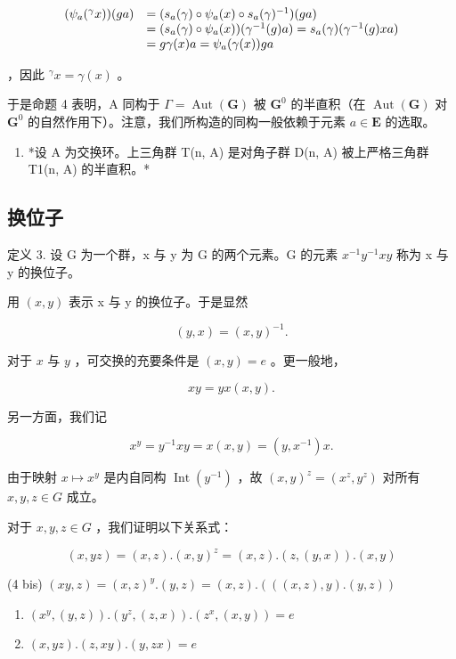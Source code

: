 \[
\begin{array}{r l} (\psi_ {a} (^ {\gamma} x)) (g a) & = (s _ {a} (\gamma) \circ \psi_ {a} (x) \circ s _ {a} (\gamma) ^ {- 1}) (g a) \\ & = (s _ {a} (\gamma) \circ \psi_ {a} (x)) (\gamma^ {- 1} (g) a) = s _ {a} (\gamma) (\gamma^ {- 1} (g) x a) \\ & = g \gamma (x) a = \psi_ {a} (\gamma (x)) g a \end{array}
\]

，因此 \({}^{\gamma}x = \gamma(x)\) 。

于是命题 4 表明，A 同构于 \(\Gamma = \operatorname{Aut}(\mathbf{G})\) 被 \(\mathbf{G}^0\) 的半直积（在 \(\operatorname{Aut}(\mathbf{G})\) 对 \(\mathbf{G}^0\) 的自然作用下）。注意，我们所构造的同构一般依赖于元素 \(a \in \mathbf{E}\) 的选取。

\begin{enumerate}
\def\labelenumi{(\arabic{enumi})}
\setcounter{enumi}{1}
\tightlist
\item
  *设 A 为交换环。上三角群 T(n, A) 是对角子群 D(n, A) 被上严格三角群 T1(n, A) 的半直积。*
\end{enumerate}

\subsection{换位子}

定义 3. 设 G 为一个群，x 与 y 为 G 的两个元素。G 的元素 \(x^{-1}y^{-1}xy\) 称为 x 与 y 的换位子。

用 \((x,y)\) 表示 x 与 y 的换位子。于是显然

\[
(y, x) = (x, y) ^ {- 1}.
\]

对于 \(x\) 与 \(y\) ，可交换的充要条件是 \((x, y) = e\) 。更一般地，

\[
x y = y x (x, y).
\]

另一方面，我们记

\[
x ^ {y} = y ^ {- 1} x y = x (x, y) = (y, x ^ {- 1}) x.\tag{3}
\]

由于映射 \(x \mapsto x^y\) 是内自同构 \(\operatorname{Int}(y^{-1})\) ，故 \((x, y)^z = (x^z, y^z)\) 对所有 \(x, y, z \in G\) 成立。

对于 \(x, y, z \in G\) ，我们证明以下关系式：

\[
(x, y z) = (x, z). (x, y) ^ {z} = (x, z). (z, (y, x)). (x, y)\tag{4}
\]

(4 bis) \((xy,z) = (x,z)^y.(y,z) = (x,z).(((x,z),y).(y,z))\)

\begin{enumerate}
\def\labelenumi{(\arabic{enumi})}
\setcounter{enumi}{4}
\item
  \((x^{y}, (y, z)).(y^{z}, (z, x)).(z^{x}, (x, y)) = e\)
\item
  \((x, yz).(z, xy).(y, zx) = e\)
\end{enumerate}

